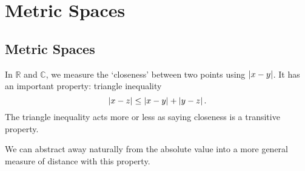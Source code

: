 \documentclass{article}
\theoremstyle{plain}\theoremheaderfont{\normalfont\itshape}\theorembodyfont{\rmfamily}\theoremseparator{.}\newtheorem*{rem}{Remark}\newtheorem*{ex}{Example}\newtheorem*{proof}{Proof}\newtheorem*{altp}{Alternative proof}
\theoremstyle{plain}\theoremheaderfont{\normalfont\bfseries}\theorembodyfont{\rmfamily}\theoremseparator{.}\newtheorem{thm}{Theorem}[section]\newtheorem{lem}[thm]{Lemma}\newtheorem{prop}[thm]{Proposition}\newtheorem*{cor}{Corollary}\newtheorem{defn}[thm]{Definition}\newtheorem{clm}[thm]{Claim}\newtheorem{clminproof}{Claim}
\theoremstyle{break}\theoremheaderfont{\normalfont\itshape}\theorembodyfont{\rmfamily}\theoremseparator{.\medskip}\newtheorem*{proofskip}{Proof}\newtheorem*{exs}{Examples}\newtheorem*{rems}{Remarks}
\theoremstyle{break}\theoremheaderfont{\normalfont\bfseries}\theorembodyfont{\rmfamily}\theoremseparator{.\medskip}\newtheorem{lemskip}[thm]{Lemma}\newtheorem{defnskip}[thm]{Definition}\newtheorem{propskip}[thm]{Proposition}\newtheorem{thmskip}[thm]{Theorem}
\begin{document}
    \section{Metric Spaces}
    \subsection{Metric Spaces}
    In \(\mathbb{R}\) and \(\mathbb{C}\), we measure the `closeness' between two points using \(\abs{x-y}\). It has an important property: triangle inequality
    \[\abs{x-z}\le\abs{x-y}+\abs{y-z}\,.\]
    The triangle inequality acts more or less as saying closeness is a transitive property.

    We can abstract away naturally from the absolute value into a more general measure of distance with this property.
\end{document}
